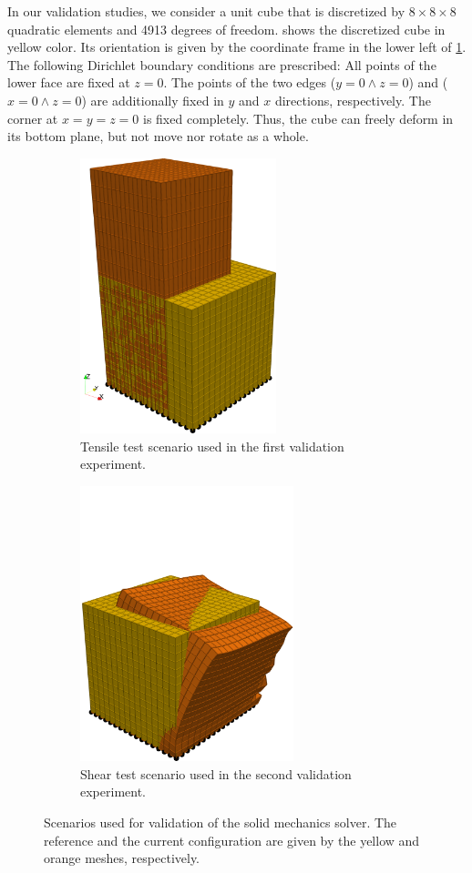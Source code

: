 In our validation studies, we consider a unit cube  that is discretized by $8\times 8 \times 8$ quadratic elements and 4913 degrees of freedom.  shows the discretized cube in yellow color. Its orientation is given by the coordinate frame in the lower left of \cref{fig:tensile_test_img}. 
The following Dirichlet boundary conditions are prescribed: All points of the lower face are fixed at $z=0$. The points of the two edges ($y=0 \wedge z=0$) and ($x=0 \wedge z=0$) are additionally fixed in $y$ and $x$ directions, respectively. The corner at $x=y=z=0$ is fixed completely. Thus, the cube can freely deform in its bottom plane, but not move nor rotate as a whole. 

\begin{figure}
  \centering%
  \hfill
  \begin{subfigure}[t]{0.45\textwidth}%
    \centering%
    \includegraphics[height=8cm]{images/results/basic/tensile_test_img.png}%
    \caption{Tensile test scenario used in the first validation experiment.}%
    \label{fig:tensile_test_img}%
  \end{subfigure}\hfill
  \begin{subfigure}[t]{0.45\textwidth}%
    \centering%
    \includegraphics[height=8cm]{images/results/basic/shear_test_img.png}%
    \caption{Shear test scenario used in the second validation experiment.}%
    \label{fig:shear_test_img}%
  \end{subfigure}
  \hfill
  \caption{Scenarios used for validation of the solid mechanics solver. The reference and the current configuration are given by the yellow and orange meshes, respectively.}%
  \label{fig:tensile_shear_test_img}%
\end{figure}%

